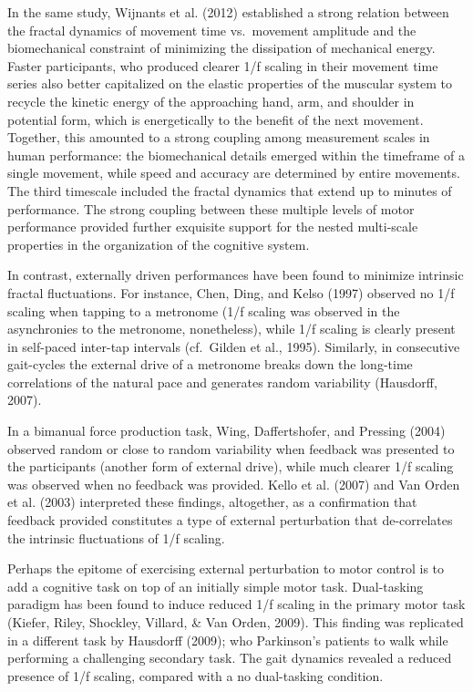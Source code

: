 \documentclass[12pt,]{book}
\begin{document}
In the same study, Wijnants et al. (2012) established a strong relation between the fractal dynamics of movement time vs.~movement amplitude and the biomechanical constraint of minimizing the dissipation of mechanical energy. Faster participants, who produced clearer 1/f scaling in their movement time series also better capitalized on the elastic properties of the muscular system to recycle the kinetic energy of the approaching hand, arm, and shoulder in potential form, which is energetically to the benefit of the next movement. Together, this amounted to a strong coupling among measurement scales in human performance: the biomechanical details emerged within the timeframe of a single movement, while speed and accuracy are determined by entire movements. The third timescale included the fractal dynamics that extend up to minutes of performance. The strong coupling between these multiple levels of motor performance provided further exquisite support for the nested multi-scale properties in the organization of the cognitive system.

In contrast, externally driven performances have been found to minimize intrinsic fractal fluctuations. For instance, Chen, Ding, and Kelso (1997) observed no 1/f scaling when tapping to a metronome (1/f scaling was observed in the asynchronies to the metronome, nonetheless), while 1/f scaling is clearly present in self-paced inter-tap intervals (cf.~Gilden et al., 1995). Similarly, in consecutive gait-cycles the external drive of a metronome breaks down the long-time correlations of the natural pace and generates random variability (Hausdorff, 2007).

In a bimanual force production task, Wing, Daffertshofer, and Pressing (2004) observed random or close to random variability when feedback was presented to the participants (another form of external drive), while much clearer 1/f scaling was observed when no feedback was provided. Kello et al. (2007) and Van Orden et al. (2003) interpreted these findings, altogether, as a confirmation that feedback provided constitutes a type of external perturbation that de-correlates the intrinsic fluctuations of 1/f scaling.

Perhaps the epitome of exercising external perturbation to motor control is to add a cognitive task on top of an initially simple motor task. Dual-tasking paradigm has been found to induce reduced 1/f scaling in the primary motor task (Kiefer, Riley, Shockley, Villard, \& Van Orden, 2009). This finding was replicated in a different task by Hausdorff (2009); who Parkinson's patients to walk while performing a challenging secondary task. The gait dynamics revealed a reduced presence of 1/f scaling, compared with a no dual-tasking condition.
\end{document}
